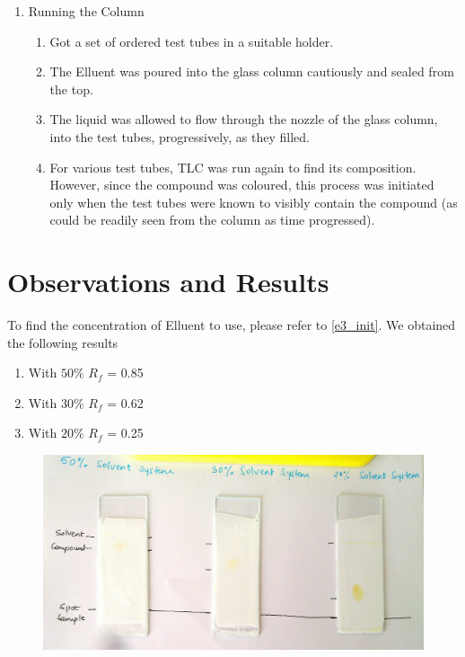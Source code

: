\begin{enumerate}
\begin{enumerate}
		\end{enumerate}
		\item Running the Column
		\begin{enumerate}
			\item Got a set of ordered test tubes in a suitable holder.
			\item The Elluent was poured into the glass column cautiously and sealed from the top.
			\item The liquid was allowed to flow through the nozzle of the glass column, into the test tubes, progressively, as they filled.
			\item For various test tubes, TLC was run again to find its composition. However, since the compound was coloured, this process was initiated only when the test tubes were known to visibly contain the compound (as could be readily seen from the column as time progressed).
		\end{enumerate}


	\end{enumerate}
\section{Observations and Results}		
	To find the concentration of Elluent to use, please refer to \autoref{e3_init}. We obtained the following results
	\begin{enumerate}
		\item With $50\%$ $R_f$ = 0.85
		\item With $30\%$ $R_f$ = 0.62
		\item With $20\%$ $R_f$ = 0.25
	\end{enumerate}

	\begin{figure}[bth]
		\begin{center}
			\includegraphics[width=1.2\linewidth]{gfx/e3_init}
		\end{center}
	\caption[TLC plates for the Initial Run]{\label{e3_init}}
	\end{figure}

